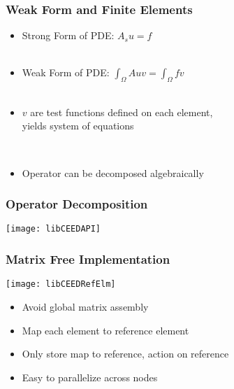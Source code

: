 \documentclass{beamer}
\begin{document}
\begin{frame}
\begin{center}
\frametitle{Weak Form and Finite Elements}

\begin{itemize}

\item Strong Form of PDE: $A_s u = f$\\

~\\

\item Weak Form of PDE: $\int_\Omega A u v = \int_\Omega f v$\\

~\\

\item $v$ are test functions defined on each element,\\

\hspace{6mm} yields system of equations

~\\

\item Operator can be decomposed algebraically

\end{itemize}

\end{center}
\end{frame}


\begin{frame}
\begin{center}
\frametitle{Operator Decomposition}

\texttt{[image: libCEEDAPI]}

\end{center}
\end{frame}


\begin{frame}
\begin{center}
\frametitle{Matrix Free Implementation}

\texttt{[image: libCEEDRefElm]}

\begin{itemize}

\item Avoid global matrix assembly

\item Map each element to reference element

\item Only store map to reference, action on reference

\item Easy to parallelize across nodes

\end{itemize}

\end{center}
\end{frame}
\end{document}
